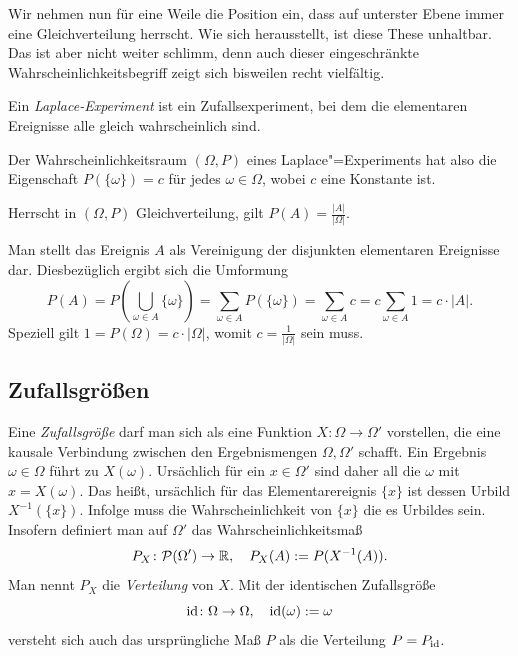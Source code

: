Wir nehmen nun für eine Weile die Position ein, dass auf unterster Ebene
immer eine Gleichverteilung herrscht. Wie sich herausstellt, ist diese
These unhaltbar. Das ist aber nicht weiter schlimm, denn auch dieser
eingeschränkte Wahrscheinlichkeitsbegriff zeigt sich bisweilen recht
vielfältig.

\begin{Definition}\newlinefirst
Ein \emph{Laplace-Experiment} ist ein Zufallsexperiment, bei dem die
elementaren Ereignisse alle gleich wahrscheinlich sind.
\end{Definition}

\noindent
Der Wahrscheinlichkeitsraum $(\Omega,P)$ eines Laplace"=Experiments
hat also die Eigenschaft $P(\{\omega\})=c$ für jedes $\omega\in\Omega$,
wobei $c$ eine Konstante ist.

\begin{Satz}
Herrscht in $(\Omega,P)$ Gleichverteilung, gilt $P(A) = \frac{|A|}{|\Omega|}$.
\end{Satz}
\begin{Beweis}
Man stellt das Ereignis $A$ als Vereinigung der disjunkten elementaren
Ereignisse dar. Diesbezüglich ergibt sich die Umformung
\[P(A) = P(\bigcup_{\omega\in A}\{\omega\})
= \sum_{\omega\in A}P(\{\omega\}) = \sum_{\omega\in A} c
= c\sum_{\omega\in A} 1 = c\cdot |A|.\]
Speziell gilt $1=P(\Omega)=c\cdot |\Omega|$, womit
$c=\frac{1}{|\Omega|}$ sein muss.\,\qedsymbol
\end{Beweis}

\subsection{Zufallsgrößen}

Eine \emph{Zufallsgröße} darf man
sich als eine Funktion $X\colon\Omega\to\Omega'$
vorstellen, die eine kausale Verbindung zwischen den Ergebnismengen
$\Omega,\Omega'$ schafft. Ein Ergebnis $\omega\in\Omega$ führt
zu $X(\omega)$. Ursächlich für ein $x\in\Omega'$ sind daher all die
$\omega$ mit $x=X(\omega)$. Das heißt, ursächlich für das
Elementarereignis $\{x\}$ ist dessen Urbild $X^{-1}(\{x\})$.
Infolge muss die Wahrscheinlichkeit von $\{x\}$ die es Urbildes sein.
Insofern definiert man auf $\Omega'$ das Wahrscheinlichkeitsmaß%
\[P_X\colon\mathcal P(\Omega')\to\mathbb R,\quad P_X(A) := P(X^{-1}(A)).\]
Man nennt $P_X$ die \emph{Verteilung} von $X$. Mit der
identischen Zufallsgröße
\[\operatorname{id}\colon\Omega\to\Omega,\quad \operatorname{id}(\omega) := \omega\]
versteht sich auch das ursprüngliche Maß $P$ als die Verteilung $P=P_{\operatorname{id}}$.

